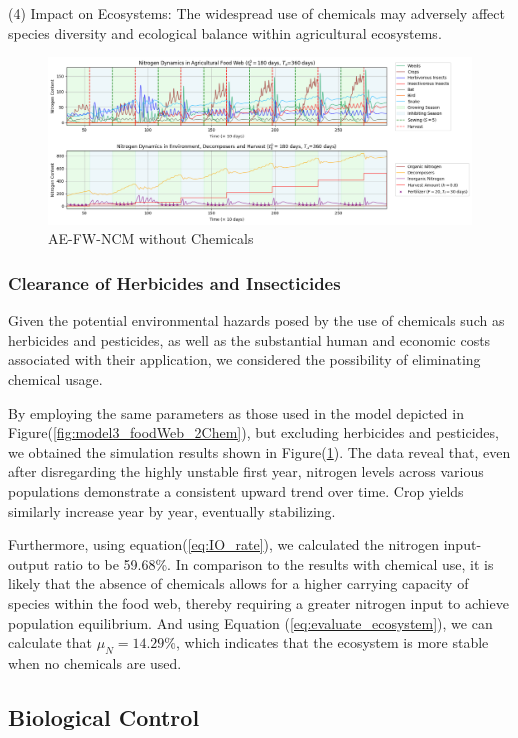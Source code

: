\documentclass{mcmthesis}
\begin{document}
(4) Impact on Ecosystems: The widespread use of chemicals may adversely affect species diversity and ecological balance within agricultural ecosystems. 
\begin{figure}[ht] 
\centering
\includegraphics[width=\textwidth]{figures/model3_food_web_noChem.png}
\setlength{\abovecaptionskip}{-0.5cm} 
\caption{AE-FW-NCM without Chemicals}
\label{fig:model3_foodWeb_noChem}
\end{figure}

\subsubsection{Clearance of Herbicides and Insecticides}
Given the potential environmental hazards posed by the use of chemicals such as herbicides and pesticides, as well as the substantial human and economic costs associated with their application, we considered the possibility of eliminating chemical usage.

By employing the same parameters as those used in the model depicted in Figure(\ref{fig:model3_foodWeb_2Chem}), but excluding herbicides and pesticides, we obtained the simulation results shown in  Figure(\ref{fig:model3_foodWeb_noChem}). The data reveal that, even after disregarding the highly unstable first year, nitrogen levels across various populations demonstrate a consistent upward trend over time. Crop yields similarly increase year by year, eventually stabilizing.

Furthermore, using equation(\ref{eq:IO_rate}), we calculated the nitrogen input-output ratio to be 59.68\%. In comparison to the results with chemical use, it is likely that the absence of chemicals allows for a higher carrying capacity of species within the food web, thereby requiring a greater nitrogen input to achieve population equilibrium. And using Equation (\ref{eq:evaluate_ecosystem}), we can calculate that \(\mu_N = 14.29\%\), which indicates that the ecosystem is more stable when no chemicals are used.
\subsection{Biological Control}
\end{document}
